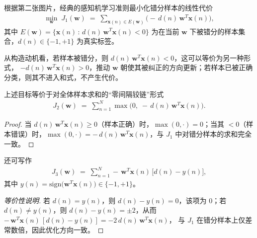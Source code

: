 \begin{definition}
根据第二张图片，经典的感知机学习准则最小化错分样本的线性代价
\begin{align}
\min_{\boldsymbol{w}}\; J_1(\boldsymbol{w}) \;=\; \sum_{\boldsymbol{x}(n)\in E(\boldsymbol{w})} \big(-\,d(n)\,\boldsymbol{w}^T\boldsymbol{x}(n)\big),
\end{align}
其中 $E(\boldsymbol{w})=\{\boldsymbol{x}(n)\,:\, d(n)\, \boldsymbol{w}^T\boldsymbol{x}(n)<0\}$ 为在当前 $\boldsymbol{w}$ 下被错分的样本集合，$d(n)\in\{-1,+1\}$ 为真实标签。
\end{definition} 

从构造动机看，若样本被错分，则 $d(n)\,\boldsymbol{w}^T\boldsymbol{x}(n)<0$，这可以等价为另一种形式， $-d(n)\,\boldsymbol{w}^T\boldsymbol{x}(n)>0$，推动 $\boldsymbol{w}$ 朝使其被纠正的方向更新；若样本已被正确分类，则其不进入和式，不产生代价。

\begin{theorem}[等价的铰链式表示]
上述目标等价于对全体样本求和的“零间隔铰链”形式
\begin{align}
J_2(\boldsymbol{w}) \;=\; \sum_{n=1}^{N} \max\!\big(0,\; -\,d(n)\,\boldsymbol{w}^T\boldsymbol{x}(n)\big).
\end{align}
\end{theorem}

\begin{proof}
当 $d(n)\,\boldsymbol{w}^T\boldsymbol{x}(n)\ge 0$（样本正确）时，$\max(0,\cdot)=0$；当其 $<0$（样本错误）时，$\max(0,\cdot)=-\,d(n)\,\boldsymbol{w}^T\boldsymbol{x}(n)$，与 $J_1$ 中对错分样本的求和完全一致。
\end{proof}

\begin{theorem}[基于预测误差的等价形式]
还可写作
\begin{align}
J_3(\boldsymbol{w}) \;=\; \sum_{n=1}^N -\,\boldsymbol{w}^T\boldsymbol{x}(n)\,\big[d(n)-y(n)\big],
\end{align}
其中 $y(n)=\mathrm{sign}\!\big(\boldsymbol{w}^T\boldsymbol{x}(n)\big)\in\{-1,+1\}$。
\end{theorem}

\begin{proof}[等价性说明]
若 $d(n)=y(n)$，则 $d(n)-y(n)=0$，该项为 $0$；若 $d(n)\neq y(n)$，则 $d(n)-y(n)=\pm 2$，从而
$-\,\boldsymbol{w}^T\boldsymbol{x}(n)\,[d(n)-y(n)] = -2\,d(n)\,\boldsymbol{w}^T\boldsymbol{x}(n)$，
与 $J_1$ 在错分样本上仅差常数倍，因此优化方向一致。
\end{proof}

